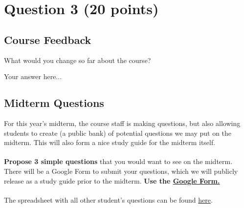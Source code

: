 \documentclass[12pt]{article}
\begin{document}
\section*{Question 3 (20 points)}
\subsection*{Course Feedback}
What would you change so far about the course?

\begin{solution}
Your answer here...
\end{solution}

\subsection*{Midterm Questions}
For this year's midterm, the course staff is making questions, but also allowing students to create (a public bank) of potential questions we may put on the midterm. This will also form a nice study guide for the midterm itself.
\\\\
\textbf{Propose 3 simple questions} that you would want to see on the midterm. There will be a Google Form to submit your questions, which we will publicly release as a study guide prior to the midterm. \textbf{Use the \href{https://forms.gle/9Zqc9jFWd1SfdbrA9}{Google Form.}}
\\\\
The spreadsheet with all other student's questions can be found \href{https://docs.google.com/spreadsheets/d/1tT2kpBZB2Ab947VrmPoJ8w-VXta68E7jwSp7Z-rO3RE/edit}{here}.
\end{document}
